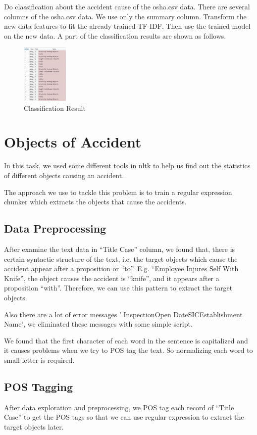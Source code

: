 \documentclass[DIV=calc, paper=a4, fontsize=11pt, twocolumn]{scrartcl}	 %
\begin{document}
Do classification about the accident cause of the osha.csv data. There
are several columns of the osha.csv data. We use only the summary
column. Transform the new data features to fit the already trained
TF-IDF. Then use the trained model on the new data. A part of the
classification results are shown as follows.

\begin{figure}[h!]
  \centering
      \includegraphics[width=0.2\textwidth]{class_result.png}
   \caption{Classification Result}
\end{figure}

\section{Objects of Accident}
In this task, we used some different tools in nltk to help us find out
the statistics of different objects causing an accident.


The approach we use to tackle this problem is to train a regular
expression chunker which extracts the objects that cause the
accidents.

\subsection{Data Preprocessing}
After examine the text data in “Title Case” column, we found that,
there is certain syntactic structure of the text, i.e. the target
objects which cause the accident appear after a proposition or
“to”. E.g. “Employee Injures Self With Knife”, the object causes the
accident is “knife”, and it appears after a proposition
“with”. Therefore, we can use this pattern to extract the target
objects.

Also there are a lot of error messages ' InspectionOpen
DateSICEstablishment Name', we eliminated these messages with some
simple script.

We found that the first character of each word in the sentence is
capitalized and it causes problems when we try to POS tag the text. So
normalizing each word to small letter is required.


\subsection{POS Tagging}
After data exploration and preprocessing, we POS tag each record of
“Title Case” to get the POS tags so that we can use regular expression
to extract the target objects later.
\end{document}

